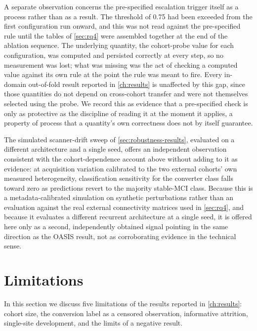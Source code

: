 A separate observation concerns the pre-specified escalation trigger itself as a process
rather than as a result. The threshold of 0.75 had been exceeded from the first configuration run
onward, and this was not read against the pre-specified rule until the tables of
\autoref{sec:rq4} were assembled together at the end of the ablation sequence. The
underlying quantity, the cohort-probe value for each configuration, was computed and
persisted correctly at every step, so no measurement was lost; what was missing was the act
of checking a computed value against its own rule at the point the rule was meant to fire.
Every in-domain out-of-fold result reported in \autoref{ch:results} is unaffected by this
gap, since those quantities do not depend on cross-cohort transfer and were not themselves
selected using the probe. We record this as evidence that a pre-specified check is only as
protective as the discipline of reading it at the moment it applies, a property of process
that a quantity's own correctness does not by itself guarantee.

The simulated scanner-drift sweep of \autoref{sec:robustness-results}, evaluated on a
different architecture and a single seed, offers an independent observation consistent with
the cohort-dependence account above without adding to it as evidence: at acquisition
variation calibrated to the two external cohorts' own measured heterogeneity, classification
sensitivity for the converter class falls toward zero as predictions revert to the majority
stable-\ac{MCI} class. Because this is a metadata-calibrated simulation on synthetic
perturbations rather than an evaluation against the real external connectivity matrices
used in \autoref{sec:rq4}, and because it evaluates a different recurrent architecture at a
single seed, it is offered here only as a second, independently obtained signal pointing in
the same direction as the \ac{OASIS} result, not as corroborating evidence in the technical
sense.

\section{Limitations}\label{sec:limitations}

In this section we discuss five limitations of the results reported in
\autoref{ch:results}: cohort size, the conversion label as a censored observation,
informative attrition, single-site development, and the limits of a negative result.

